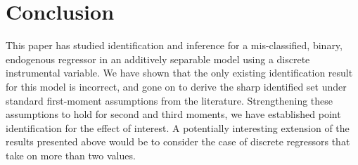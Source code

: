 \section{Conclusion}
\label{sec:conclusion}

This paper has studied identification and inference for a mis-classified, binary, endogenous regressor in an additively separable model using a discrete instrumental variable.
We have shown that the only existing identification result for this model is incorrect, and gone on to derive the sharp identified set under standard first-moment assumptions from the literature.
Strengthening these assumptions to hold for second and third moments, we have established point identification for the effect of interest.
A potentially interesting extension of the results presented above would be to consider the case of discrete regressors that take on more than two values.
